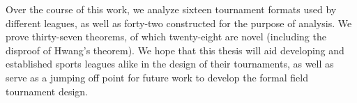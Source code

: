 {    Over the course of this work, we analyze sixteen tournament formats used by different leagues, as well as forty-two constructed for the purpose of analysis. We prove thirty-seven theorems, of which twenty-eight are novel (including the disproof of Hwang's theorem). We hope that this thesis will aid developing and established sports leagues alike in the design of their tournaments, as well as serve as a jumping off point for future work to develop the formal field tournament design.
}


